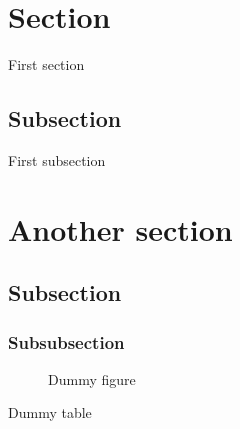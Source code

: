 \documentclass{article}
\begin{document}
\doublespacing  %
\tableofcontents  %
\singlespacing  %
\newpage

\section{Section}

First section

\subsection{Subsection}

First subsection

\section{Another section}
\subsection{Subsection}
\subsubsection{Subsubsection}

\begin{figure}
   \caption{Dummy figure}
\end{figure}
 
\begin{table}
   \caption{Dummy table}
\end{table}

\begin{appendix}
   \listoffigures  %
   \listoftables  %
\end{appendix}
\end{document}
